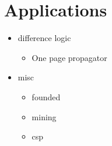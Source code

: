 
\section{Applications}\label{sec:application}

\begin{itemize}
\item difference logic
  \begin{itemize}
  \item One page propagator
  \end{itemize}
\item misc
\begin{itemize}
  \item founded
  \item mining
  \item csp
\end{itemize}
\end{itemize}

